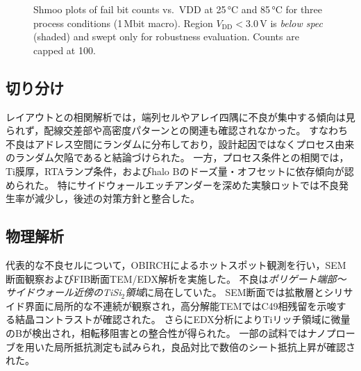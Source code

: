 \documentclass[conference]{IEEEtran}
\begin{document}
\begin{figure}[H]
\vspace{1ex}


\caption{Shmoo plots of fail bit counts vs.\ VDD at 25\,°C and 85\,°C for three process conditions (1\,Mbit macro).
Region $V_\mathrm{DD}\!<\!3.0$\,V is \emph{below spec} (shaded) and swept only for robustness evaluation.
Counts are capped at 100.}
\label{fig:shmoo_failcount_temp}
\end{figure}

\subsection{切り分け}
レイアウトとの相関解析では，端列セルやアレイ四隅に不良が集中する傾向は見られず，配線交差部や高密度パターンとの関連も確認されなかった。  
すなわち不良はアドレス空間にランダムに分布しており，設計起因ではなくプロセス由来のランダム欠陥であると結論づけられた。  
一方，プロセス条件との相関では，Ti膜厚，RTAランプ条件，およびhalo Bのドーズ量・オフセットに依存傾向が認められた。  
特にサイドウォールエッチアンダーを深めた実験ロットでは不良発生率が減少し，後述の対策方針と整合した。

\subsection{物理解析}
代表的な不良セルについて，OBIRCHによるホットスポット観測を行い，SEM断面観察およびFIB断面TEM/EDX解析を実施した。  
不良は\emph{ポリゲート端部〜サイドウォール近傍のTiSi$_2$領域}に局在していた。  
SEM断面では拡散層とシリサイド界面に局所的な不連続が観察され，高分解能TEMではC49相残留を示唆する結晶コントラストが確認された。  
さらにEDX分析によりTiリッチ領域に微量のBが検出され，相転移阻害との整合性が得られた。  
一部の試料ではナノプローブを用いた局所抵抗測定も試みられ，良品対比で数倍のシート抵抗上昇が確認された。
\end{document}

